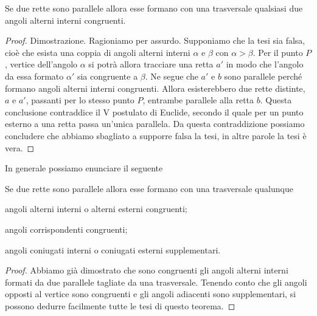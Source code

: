 \begin{teorema}
Se due rette sono parallele allora esse formano con una trasversale qualsiasi due angoli alterni interni congruenti.
\end{teorema}

\begin{proof}
Dimostrazione. Ragioniamo per assurdo. Supponiamo che la tesi sia falsa, cioè che esista una coppia di angoli alterni interni $\alpha$ e $\beta$ con $\alpha>\beta$. Per il punto $P$, vertice dell'angolo $\alpha$ si potrà allora tracciare una retta $a'$ in modo che l'angolo da essa formato $\alpha'$ sia congruente a $\beta$. Ne segue che $a'$ e $b$ sono parallele perché formano angoli alterni interni congruenti. Allora esisterebbero due rette distinte, $a$ e $a'$, passanti per lo stesso punto $P$, entrambe parallele alla retta $b$. Questa conclusione contraddice il V postulato di Euclide, secondo il quale per un punto esterno a una retta passa un'unica parallela. Da questa contraddizione possiamo concludere che abbiamo sbagliato a supporre falsa la tesi, in altre parole la tesi è vera.
\end{proof}

In generale possiamo enunciare il seguente
\begin{teorema}
Se due rette sono parallele allora esse formano con una trasversale qualunque
\begin{itemize*}
\item angoli alterni interni o alterni esterni congruenti;
\item angoli corrispondenti congruenti;
\item angoli coniugati interni o coniugati esterni supplementari.
\end{itemize*}
\end{teorema}

\begin{proof}
Abbiamo già dimostrato che sono congruenti gli angoli alterni interni formati da due parallele tagliate da una trasversale. Tenendo conto che gli angoli opposti al vertice sono congruenti e gli angoli adiacenti sono supplementari, si possono dedurre facilmente tutte le tesi di questo teorema.
\end{proof}



%


